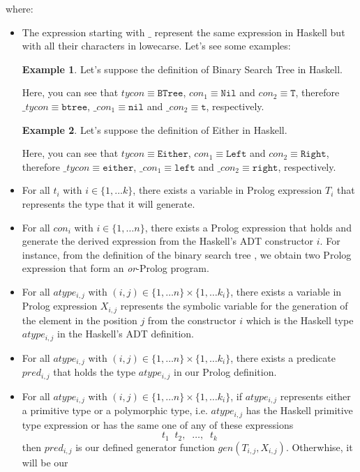 \documentclass{report}
\theoremstyle{definition}
\newtheorem{example}{Example}[section]
\theoremstyle{definition}
\newcommand{\ttt}[1]{\texttt{#1}}
\newcommand{\tav}{\;\;}
\begin{document}
where:
\begin{itemize}
	\item The expression starting with $\_$ represent the same expression in Haskell but with all their characters in lowecarse. Let's see some examples:
	      	      
	      \begin{example}
	      	Let's suppose the definition of Binary Search Tree in Haskell.
	      	
	      	Here, you can see that $tycon \equiv \ttt{BTree}$, $con_1 \equiv \ttt{Nil}$ and $con_2 \equiv \ttt{T}$, therefore $\_tycon \equiv \ttt{btree}$, $\_con_1 \equiv \ttt{nil}$ and $\_con_2 \equiv \ttt{t}$, respectively.
	      \end{example}
	      \begin{example}
	      	Let's suppose the definition of Either in Haskell.
	      	
	      	Here, you can see that $tycon \equiv \ttt{Either}$, $con_1 \equiv \ttt{Left}$ and $con_2 \equiv \ttt{Right}$, therefore $\_tycon \equiv \ttt{either}$, $\_con_1 \equiv \ttt{left}$ and $\_con_2 \equiv \ttt{right}$, respectively.
	      \end{example}
	      
	\item For all $t_i$ with $i \in \{1, \ldots k \}$, there exists a variable in Prolog expression $T_i$ that represents the type that it will generate.
	\item For all $con_i$ with $i \in \{1, \ldots n \}$, there exists a Prolog expression that holds and generate the derived expression from the Haskell's ADT constructor $i$. For instance, from the definition of the binary search tree , we obtain two Prolog expression that form an \textit{or}-Prolog program.
	\item For all $atype_{i,j}$ with $(i,j) \in \{1, \ldots n \} \times \{1, \ldots k_i \}$, there exists a variable in Prolog expression $X_{i,j}$ represents the symbolic variable for the generation of the element in the position $j$ from the constructor $i$ which is the Haskell type $atype_{i,j}$ in the Haskell's ADT definition.
	\item For all $atype_{i,j}$ with $(i,j) \in \{1, \ldots n \} \times \{1, \ldots k_i \}$, there exists a predicate $pred_{i,j}$ that holds the type $atype_{i,j}$ in our Prolog definition.
	\item For all $atype_{i,j}$ with $(i,j) \in \{1, \ldots n \} \times \{1, \ldots k_i \}$, if $atype_{i,j}$ represents either a primitive type or a polymorphic type, i.e. $atype_{i,j}$ has the Haskell primitive type expression or has the same one of any of these expressions $$t_1 \tav t_2, \tav \ldots, \tav t_k$$ then $pred_{i,j}$ is our defined generator function $gen(T_{i,j}, X_{i,j})$. Otherwhise, it will be our
\end{itemize}
\end{document}
